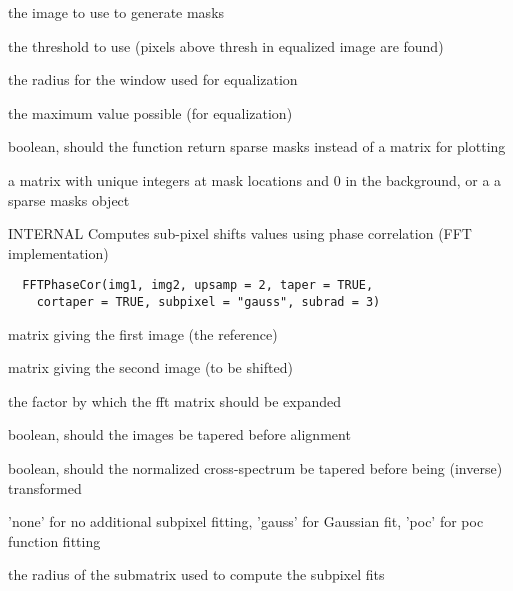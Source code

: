 \documentclass[a4paper]{book}
\begin{document}
%
\begin{Arguments}
\begin{ldescription}
\item[\code{image}] the image to use to generate masks

\item[\code{thresh}] the threshold to use (pixels above thresh
in equalized image are found)

\item[\code{radius}] the radius for the window used for
equalization

\item[\code{fullmax}] the maximum value possible (for
equalization)

\item[\code{sparse}] boolean, should the function return sparse
masks instead of a matrix for plotting
\end{ldescription}
\end{Arguments}
%
\begin{Value}
a matrix with unique integers at mask locations and 0 in
the background, or a a sparse masks object
\end{Value}
%
\begin{Description}\relax
INTERNAL Computes sub-pixel shifts values using phase
correlation (FFT implementation)
\end{Description}
%
\begin{Usage}
\begin{verbatim}
  FFTPhaseCor(img1, img2, upsamp = 2, taper = TRUE,
    cortaper = TRUE, subpixel = "gauss", subrad = 3)
\end{verbatim}
\end{Usage}
%
\begin{Arguments}
\begin{ldescription}
\item[\code{img1}] matrix giving the first image (the
reference)

\item[\code{img2}] matrix giving the second image (to be
shifted)

\item[\code{upsamp}] the factor by which the fft matrix should
be expanded

\item[\code{taper}] boolean, should the images be tapered before
alignment

\item[\code{cortaper}] boolean, should the normalized
cross-spectrum be tapered before being (inverse)
transformed

\item[\code{subpixel}] 'none' for no additional subpixel
fitting, 'gauss' for Gaussian fit, 'poc' for poc function
fitting

\item[\code{subrad}] the radius of the submatrix used to compute
the subpixel fits
\end{ldescription}
\end{Arguments}
\end{document}

